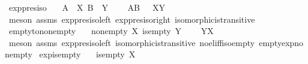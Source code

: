 \begin{isabellebody}
\isamarkupfalse%
%
\endisatagproof
{\isafoldproof}%
%
\isadelimproof
\isanewline
%
\endisadelimproof
\isanewline
{}\isamarkupfalse%
\ exp{\isacharunderscore}{\kern0pt}pres{\isacharunderscore}{\kern0pt}iso{\isacharcolon}{\kern0pt}\isanewline
\ \ \ {\isachardoublequoteopen}A\ {\isasymcong}\ X{\isachardoublequoteclose}\ {\isachardoublequoteopen}B\ {\isasymcong}\ Y{\isachardoublequoteclose}\ \isanewline
\ \ \ {\isachardoublequoteopen}A\isactrlbsup B\isactrlesup \ {\isasymcong}\ \ X\isactrlbsup Y\isactrlesup {\isachardoublequoteclose}\isanewline
%
\isadelimproof
\ \ %
\endisadelimproof
%
\isatagproof
{}\isamarkupfalse%
\ {\isacharparenleft}{\kern0pt}meson\ assms\ exp{\isacharunderscore}{\kern0pt}pres{\isacharunderscore}{\kern0pt}iso{\isacharunderscore}{\kern0pt}left\ exp{\isacharunderscore}{\kern0pt}pres{\isacharunderscore}{\kern0pt}iso{\isacharunderscore}{\kern0pt}right\ isomorphic{\isacharunderscore}{\kern0pt}is{\isacharunderscore}{\kern0pt}transitive{\isacharparenright}{\kern0pt}%
\endisatagproof
{\isafoldproof}%
%
\isadelimproof
\isanewline
%
\endisadelimproof
\isanewline
{}\isamarkupfalse%
\ empty{\isacharunderscore}{\kern0pt}to{\isacharunderscore}{\kern0pt}nonempty{\isacharcolon}{\kern0pt}\isanewline
\ \ \ {\isachardoublequoteopen}nonempty\ X{\isachardoublequoteclose}\ {\isachardoublequoteopen}is{\isacharunderscore}{\kern0pt}empty\ Y{\isachardoublequoteclose}\ \isanewline
\ \ \ {\isachardoublequoteopen}Y\isactrlbsup X\isactrlesup \ {\isasymcong}\ {\isasymemptyset}{\isachardoublequoteclose}\isanewline
%
\isadelimproof
\ \ %
\endisadelimproof
%
\isatagproof
{}\isamarkupfalse%
\ {\isacharparenleft}{\kern0pt}meson\ assms\ exp{\isacharunderscore}{\kern0pt}pres{\isacharunderscore}{\kern0pt}iso{\isacharunderscore}{\kern0pt}left\ isomorphic{\isacharunderscore}{\kern0pt}is{\isacharunderscore}{\kern0pt}transitive\ no{\isacharunderscore}{\kern0pt}el{\isacharunderscore}{\kern0pt}iff{\isacharunderscore}{\kern0pt}iso{\isacharunderscore}{\kern0pt}empty\ empty{\isacharunderscore}{\kern0pt}exp{\isacharunderscore}{\kern0pt}nonempty{\isacharparenright}{\kern0pt}%
\endisatagproof
{\isafoldproof}%
%
\isadelimproof
\isanewline
%
\endisadelimproof
\isanewline
{}\isamarkupfalse%
\ exp{\isacharunderscore}{\kern0pt}is{\isacharunderscore}{\kern0pt}empty{\isacharcolon}{\kern0pt}\isanewline
\ \ \ {\isachardoublequoteopen}is{\isacharunderscore}{\kern0pt}empty\ X{\isachardoublequoteclose}\ \isanewline

\end{isabellebody}
